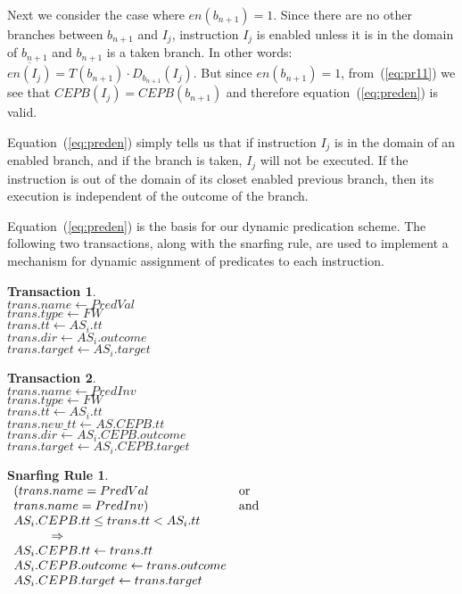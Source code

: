 \documentclass[10pt,twocolumn]{IEEEtran}
\newtheorem{trans}{Transaction}
\newtheorem{snarf}{Snarfing Rule}
\begin{document}
Next we consider the case where \mbox{$en(b_{n+1}) = 1$}.
Since there are no other branches between $b_{n+1}$ and $I_j$, instruction
$I_j$ is enabled unless it is in the domain of $b_{n+1}$ and $b_{n+1}$ is
a taken branch.  In other words:\\
\mbox{$\overline{en(I_j)} = T(b_{n+1}) \cdot D_{b_{n+1}}(I_j)$}.
But since \mbox{$en(b_{n+1}) = 1$}, 
from~(\ref{eq:pr11}) we see that \mbox{$CEPB(I_j) = CEPB(b_{n+1})$}
and therefore equation~(\ref{eq:preden}) is valid.

Equation~(\ref{eq:preden}) simply tells us that if instruction $I_j$ is in
the domain of an enabled branch, and if the branch is taken, $I_j$ will
not be executed.  If the instruction is out of the domain of its closet
enabled previous branch, then its execution is independent of the
outcome of the branch.

Equation~(\ref{eq:preden}) is the basis for our dynamic predication scheme.
The following two transactions, along with the snarfing rule, are used
to implement a mechanism for dynamic assignment of predicates 
to each instruction.

\begin{trans}
\mbox{} \\
\indent $trans.name \leftarrow PredVal $ \\
\indent $trans.type \leftarrow FW $ \\
\indent $trans.tt \leftarrow AS_i.tt$ \\
\indent $trans.dir \leftarrow AS_i.outcome $ \\
\indent $trans.target \leftarrow AS_i.target $
\end{trans}

\begin{trans}
 \mbox{} \\
 \indent $trans.name \leftarrow PredInv$ \\
 \indent $trans.type \leftarrow FW $ \\
 \indent $trans.tt \leftarrow AS_i.tt$ \\
 \indent $trans.new\_tt \leftarrow AS.CEPB.tt $ \\
 \indent $trans.dir \leftarrow AS_i.CEPB.outcome $ \\
 \indent $trans.target \leftarrow AS_i.CEPB.target $
\end{trans}

\begin{snarf}
\label{snar:predval}
\mbox{} \\
\(
\begin{array}{ll}
(trans.name = PredVal \ & \textup{or} \\ trans.name = PredInv) & \textup{and} \\
AS_i.CEPB.tt \leq trans.tt < AS_i.tt \\
\hspace{3em} \Rightarrow \\
AS_i.CEPB.tt \leftarrow trans.tt\\
AS_i.CEPB.outcome \leftarrow trans.outcome\\
AS_i.CEPB.target \leftarrow trans.target
\end{array}
\)
\end{snarf}
\end{document}
